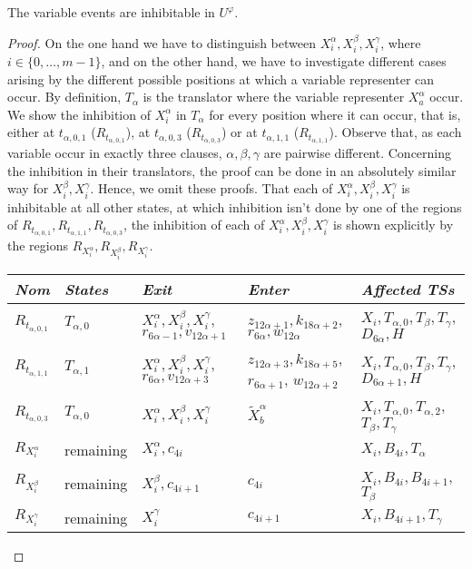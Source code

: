 \documentclass[english]{lipics_hacked}
\begin{document}
\begin{lemma}
\label{lemma:variable}
The variable events are inhibitable in $U^\varphi$.
\end{lemma}
%
\begin{proof}
On the one hand we have to distinguish between $X_i^\alpha,X_i^\beta,X_i^\gamma$, where $i\in \{0,\dots,m-1\}$, and on the other hand, we have to investigate different cases arising by the different possible positions at which a variable representer can occur.
By definition, $T_\alpha$ is the translator where the variable representer $X_a^\alpha$ occur.
We show the inhibition of $X_i^\alpha$ in $T_\alpha$ for every position where it can occur, that is, either at $t_{\alpha,0,1}$ ($R_{t_{\alpha,0,1}}$), at $t_{\alpha,0,3}$ ($R_{t_{\alpha,0,3}}$) or at $t_{\alpha,1,1}$ ($R_{t_{\alpha,1,1}}$).
Observe that, as each variable occur in exactly three clauses, $\alpha,\beta,\gamma$ are pairwise different.
Concerning the inhibition in their translators, the proof can be done in an absolutely similar way for $X_i^\beta,X_i^\gamma$.
Hence, we omit these proofs.
That each of $X_i^\alpha,X_i^\beta,X_i^\gamma$ is inhibitable at all other states, at which inhibition isn't done by one of the regions of $R_{t_{\alpha,0,1}},R_{t_{\alpha,1,1}},R_{t_{\alpha,0,3}}$,  the inhibition of each of $X_i^\alpha,X_i^\beta,X_i^\gamma$ is shown explicitly by the regions $R_{X_i^\alpha},R_{X_i^\beta},R_{X_i^\gamma} $.

\begin{longtable}{p{0.7cm} p{3cm}   p{2.5cm}    p{2.5cm}      p{2.7cm}  }
\textit{Nom} &\textit{States} & \textit{Exit} & \textit{Enter} & \textit{Affected TSs}  \\ \hline
%
$R_{t_{\alpha,0,1}}$ & $T_{\alpha,0}$ & $X_i^\alpha,X_i^\beta,X_i^\gamma$, $r_{6\alpha-1},v_{12\alpha+1}$ & $z_{12\alpha+1}, k_{18\alpha+2}$, $r_{6\alpha},w_{12\alpha}$ & $X_i, T_{\alpha,0},T_\beta,T_\gamma$, $D_{6\alpha},H$  \\
%
$R_{t_{\alpha,1,1}}$ & $T_{\alpha,1}$ & $X_i^\alpha,X_i^\beta,X_i^\gamma$, $r_{6\alpha},v_{12\alpha+3}$ & $z_{12\alpha+3}, k_{18\alpha+5}$, $r_{6\alpha+1}$, $w_{12\alpha+2}$ & $X_i, T_{\alpha,0},T_\beta,T_\gamma$, $D_{6\alpha+1},H$  \\
%
 $R_{t_{\alpha,0,3}}$& $T_{\alpha,0}$   & $X_i^\alpha,X_i^\beta,X_i^\gamma$ &  $\tilde{X}_b^\alpha$  & $X_i,T_{\alpha,0},T_{\alpha,2}$, $T_\beta,T_\gamma$   \\	
 $R_{X_i^\alpha} $ & remaining &  $X_i^\alpha,c_{4i}$ &  & $X_i,B_{4i}, T_\alpha$\\	
 $R_{X_i^\beta} $ & remaining &  $X_i^\beta,c_{4i+1}$ & $c_{4i}$ & $X_i,B_{4i},B_{4i+1}$, $T_\beta$\\	
 $R_{X_i^\gamma} $ & remaining &  $X_i^\gamma$ &  $c_{4i+1}$ & $X_i,B_{4i+1},T_\gamma$
\end{longtable}

\end{proof}
\end{document}
